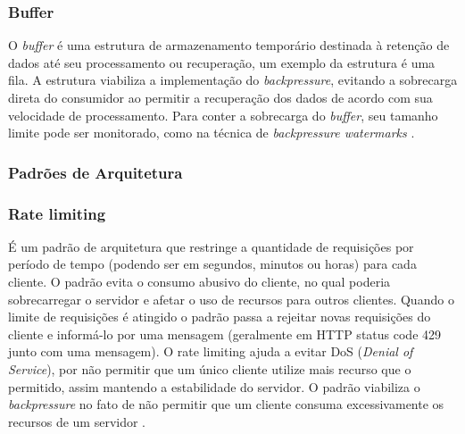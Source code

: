 \documentclass[12pt]{article}
\begin{document}
  \subsubsection{Buffer}
  O \textit{buffer} é uma estrutura de armazenamento temporário destinada à retenção de dados até seu processamento ou recuperação, um exemplo da estrutura é uma fila. A estrutura viabiliza a implementação do \textit{backpressure}, evitando a sobrecarga direta do consumidor ao permitir a recuperação dos dados de acordo com sua velocidade de processamento. Para conter a sobrecarga do \textit{buffer}, seu tamanho limite pode ser monitorado, como na técnica de \textit{backpressure watermarks} \cite{fischer2022Grokking}.

  \subsubsection{Padrões de Arquitetura}

  \subsubsection{Rate limiting}
  É um padrão de arquitetura que restringe a quantidade de requisições por período de tempo (podendo ser em segundos, minutos ou horas) para cada cliente. O padrão evita o consumo abusivo do cliente, no qual poderia sobrecarregar o servidor e afetar o uso de recursos para outros clientes. Quando o limite de requisições é atingido o padrão passa a rejeitar novas requisições do cliente e informá-lo por uma mensagem (geralmente em HTTP status code 429 junto com uma mensagem). O rate limiting ajuda a evitar DoS (\textit{Denial of Service}), por não permitir que um único cliente utilize mais recurso que o permitido, assim mantendo a estabilidade do servidor. O padrão viabiliza o \textit{backpressure} no fato de não permitir que um cliente consuma excessivamente os recursos de um servidor \cite{apiace2023Europlop, wangRatelimiting2024}.
\end{document}
